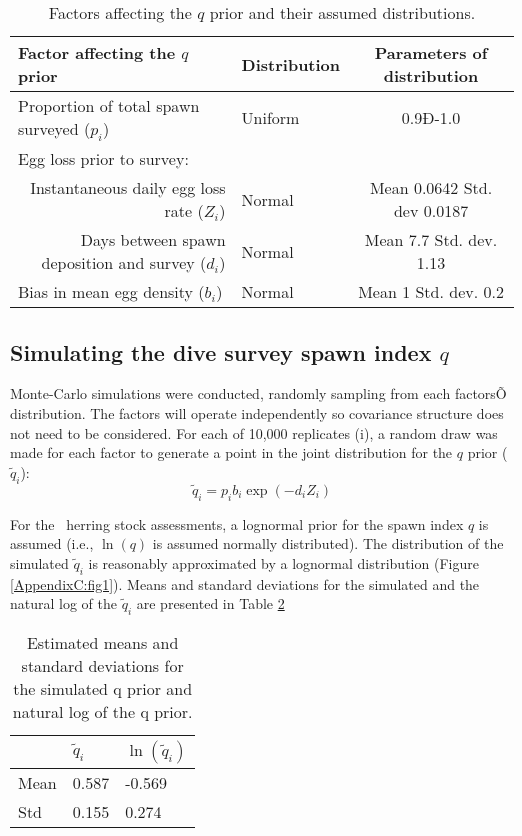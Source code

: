 \begin{table}[htdp]
\caption{Factors affecting the $q$ prior and their assumed distributions.}
\begin{center}
\begin{tabular}{llc}
\hline
Factor affecting the $q$ prior &	Distribution & Parameters of distribution\\
\hline
Proportion of total spawn surveyed ($p_i$)&Uniform &0.9Ð-1.0\\
\multicolumn{3}{l}{Egg loss prior to survey:}\\
\multicolumn{1}{r}{Instantaneous daily egg loss rate ($Z_i$)}& Normal &Mean 0.0642  Std. dev 0.0187\\
\multicolumn{1}{r}{Days between spawn deposition and survey ($d_i$)}&Normal & Mean 7.7  Std. dev. 1.13\\
Bias in mean egg density ($b_i$)&	Normal	&Mean 1  Std. dev.  0.2\\
\hline
\end{tabular}
\end{center}
\label{AppendixC:Table1}
\end{table}%





\subsection{Simulating the dive survey spawn index $q$}

Monte-Carlo simulations were conducted, randomly sampling from each factorsÕ distribution.  The factors will operate independently so covariance structure does not need to be considered. For each of 10,000 replicates (i), a random draw was made for each factor to generate a point in the joint distribution for the $q$ prior ($\tilde{q}_i$): 
\[
\tilde{q}_i = p_i b_i \exp(-d_i Z_i)
\]

For the \iscam\ herring stock assessments, a lognormal prior for the spawn index $q$ is assumed (i.e., $\ln(q)$ is assumed normally distributed). The distribution of the simulated $\tilde{q}_i$  is reasonably approximated by a lognormal distribution (Figure \ref{AppendixC:fig1}). Means and standard deviations for the simulated  and the natural log of the $\tilde{q}_i$  are presented in Table \ref{AppendixC:Table2}

\begin{table}
\caption{Estimated means and standard deviations for the simulated q prior and natural log of the q prior.}\label{AppendixC:Table2}
\begin{center}
\begin{tabular}{lll}
\hline
 & $\tilde{q}_i$ & $\ln(\tilde{q}_i)$\\
 \hline
 Mean &0.587 & -0.569\\
 Std &0.155 & 0.274 \\
 \hline
\end{tabular}
\end{center}
\end{table}


